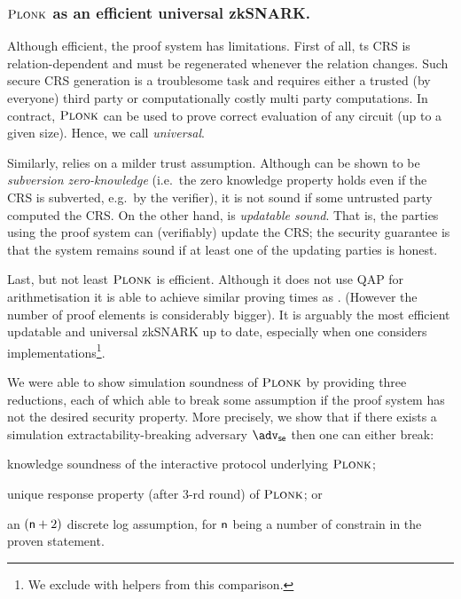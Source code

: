 \documentclass[runningheads,10pt]{llncs}
\begin{document}
	\subsubsection*{$\textsc{Plonk}$ as an efficient universal zkSNARK.}
	Although efficient, the \groth{} proof system has limitations. First of all,
  ts CRS is relation-dependent and must be regenerated whenever the relation
  changes. Such secure CRS generation is a troublesome task and requires
  either a trusted (by everyone) third party or computationally costly multi
  party computations.  In contract, $\textsc{Plonk}$ can be used to prove correct evaluation
  of any circuit (up to a given size). Hence, we call \plonk{} \emph{universal}.
	
	Similarly, \plonk{} relies on a milder trust assumption. 
	Although \groth{} can be shown to be \emph{subversion zero-knowledge} (i.e.~the zero knowledge property holds even if the CRS is subverted, e.g.~by the verifier), it is not sound if some untrusted party computed the CRS. 
	On the other hand, \plonk{} is \emph{updatable sound}. That is, the parties using the proof system can (verifiably) update the CRS; the security guarantee is that the system remains sound if at least one of the updating parties is honest.
	
	Last, but not least $\textsc{Plonk}$ is efficient. Although it does not use QAP for arithmetisation it is able to achieve similar proving times as \groth{}. (However the number of proof elements is considerably bigger). 
	It is arguably the most efficient updatable and universal zkSNARK up to date,
  especially when one considers implementations\footnote{We exclude \sonic{} with helpers
  from this comparison.}. 
	
	We were able to show simulation soundness of $\textsc{Plonk}$ by providing three reductions, each of which able to break some assumption if the proof system has not the desired security property. 
	More precisely, we show that if there exists a simulation extractability-breaking adversary $\advse$ then one can either break: 
	\begin{compactenum}
		\item \label{it:ks} knowledge soundness of the interactive protocol underlying $\textsc{Plonk}$; 
		\item \label{it:dlog} unique response property (after $3$-rd round) of $\textsc{Plonk}$; or 
		\item \label{it:ur} an $(\mathsf{n} + 2)$ discrete log assumption, for $\mathsf{n}$ being a number of constrain in the proven statement.
	\end{compactenum}
	
\end{document}
